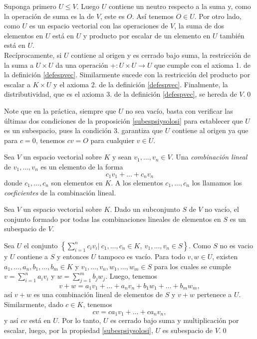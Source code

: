 \dem Suponga primero $U\le V$. Luego $U$ contiene un neutro respecto a la suma y, como la operaci\'on de suma es la de $V$, este es $O$. As\'i tenemos $O\in U$. Por otro lado, como $U$ es un espacio vectorial con las operaciones de $V$, la suma de dos elementos en $U$ est\'a en $U$ y producto por escalar de un elemento en $U$ tambi\'en est\'a en $U$.\\
Rec\'iprocamente, si $U$ contiene al origen y es cerrado bajo suma, la restricci\'on de la suma a $U\times U$ da una operaci\'on $+:U\times U\rightarrow U$ que cumple con el axioma 1. de la definici\'on \ref{defespvec}. Similarmente sucede con la restricci\'on del producto por escalar a $K\times U$ y el axioma 2. de la definici\'on \ref{defespvec}. Finalmente, la distributividad, que es el axioma 3. de la definici\'on \ref{defespvec}, se hereda de $V$.\qed

\begin{obs}
Note que en la pr\'actica, siempre que $U$ no sea vac\'io, basta con verificar las \'ultimas dos condiciones de la proposici\'on \ref{subespsiysolosi} para establecer que $U$ es un subespacio, pues la condici\'on 3. garantiza que $U$ contiene al origen ya que para $c=0$, tenemos $cv=O$ para cualquier $v\in U$.
\end{obs}

\begin{defn}
Sea $V$ un espacio vectorial sobre $K$ y sean $v_1,\ldots,v_n\in V$. Una \emph{combinaci\'on lineal} de  $v_1,\ldots,v_n$ es un elemento de la forma
\[
c_1v_1+\ldots+c_nv_n
\]
donde $c_1,\ldots,c_n$ son elementos en $K$. A los elementos $c_1,\ldots,c_n$ los llamamos los \emph{coeficientes} de la combinaci\'on lineal.
\end{defn}

\begin{prop}
Sea $V$ un espacio vectorial sobre $K$. Dado un subconjunto $S$ de $V$ no vac\'io, el conjunto formado por todas las combinaciones lineales de elementos en $S$ es un subespacio de $V$.
\end{prop}

\dem Sea $U$ el conjunto $\left\{\sum_{i=1}^nc_iv_i\Big|\ c_1,\ldots,c_n\in K,\ v_1,\ldots,v_n\in S \right\}$. Como $S$ no es vacio y $U$ contiene a $S$ y entonces $U$ tampoco es vac\'io.
Para todo $v,w\in U$, existen $a_1,\ldots,a_n,b_1,\ldots,b_m\in K$ y $v_1,\ldots,v_n,w_1,\ldots,w_m\in S$ para los cuales se cumple $v=\sum_{i=1}^n a_iv_i$ y $w=\sum_{j=1}^m b_jw_j$. Luego, tenemos
\[
v+w=a_1v_1+\ldots+a_nv_n+b_1w_1+\ldots+b_mw_m,
\]
as\'i $v+w$ es una combinaci\'on lineal de elementos de $S$ y $v+w$ pertenece a $U$. Similarmente, dado $c\in K$, tenemos
\[
cv=ca_1v_1+\ldots+ca_nv_n,
\]
y as\'i $cv$ est\'a en $U$. Por lo tanto, $U$ es cerrado bajo suma y multiplicaci\'on por escalar, luego, por la propiedad \ref{subespsiysolosi}, $U$ es subespacio de $V$.\qed

